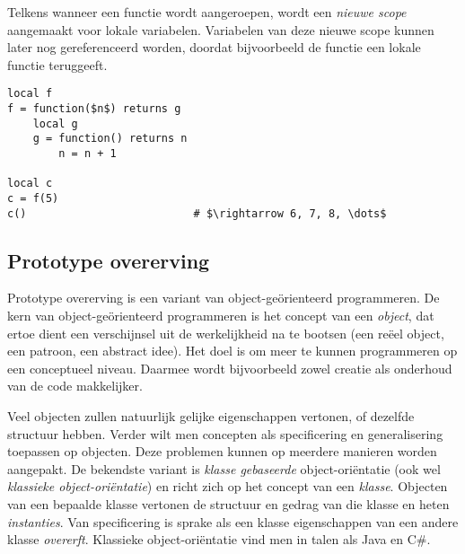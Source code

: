 
Telkens wanneer een functie wordt aangeroepen, wordt een \emph{nieuwe scope} aangemaakt voor lokale variabelen. Variabelen van deze nieuwe scope kunnen later nog gereferenceerd worden, doordat bijvoorbeeld de functie een lokale functie teruggeeft.

\newCodeFragment


\begin{lstlisting}[caption=Een countervoorbeeld,label=exa:counter]
local f
f = function($n$) returns g
    local g
    g = function() returns n
        n = n + 1

local c
c = f(5)
c()                          # $\rightarrow 6, 7, 8, \dots$
\end{lstlisting}


\subsection{Prototype overerving}

Prototype overerving is een variant van object-geörienteerd programmeren. De kern van object-geörienteerd programmeren is het concept van een \emph{object}, dat ertoe dient een verschijnsel uit de werkelijkheid na te bootsen (een reëel object, een patroon, een abstract idee). Het doel is om meer te kunnen programmeren op een conceptueel niveau. Daarmee wordt bijvoorbeeld zowel creatie als onderhoud van de code makkelijker.

Veel objecten zullen natuurlijk gelijke eigenschappen vertonen, of dezelfde structuur hebben. Verder wilt men concepten als specificering en generalisering toepassen op objecten. Deze problemen kunnen op meerdere manieren worden aangepakt. De bekendste variant is \emph{klasse gebaseerde} object-oriëntatie (ook wel \emph{klassieke object-oriëntatie}) en richt zich op het concept van een \emph{klasse}. Objecten van een bepaalde klasse vertonen de structuur en gedrag van die klasse en heten \emph{instanties}. Van specificering is sprake als een klasse eigenschappen van een andere klasse \emph{overerft}. Klassieke object-oriëntatie vind men in talen als Java en C\#.

